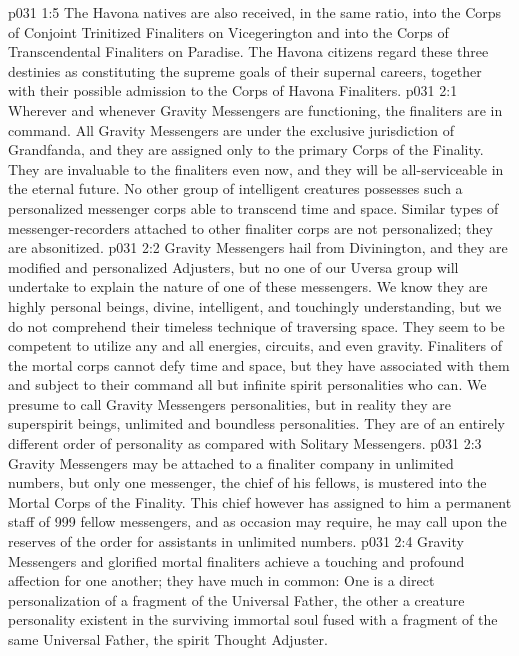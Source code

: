 \vs p031 1:5 The Havona natives are also received, in the same ratio, into the Corps of Conjoint Trinitized Finaliters on Vicegerington and into the Corps of Transcendental Finaliters on Paradise. The Havona citizens regard these three destinies as constituting the supreme goals of their supernal careers, together with their possible admission to the Corps of Havona Finaliters.
\vs p031 2:1 Wherever and whenever Gravity Messengers are functioning, the finaliters are in command. All Gravity Messengers are under the exclusive jurisdiction of Grandfanda, and they are assigned only to the primary Corps of the Finality. They are invaluable to the finaliters even now, and they will be all\hyp{}serviceable in the eternal future. No other group of intelligent creatures possesses such a personalized messenger corps able to transcend time and space. Similar types of messenger\hyp{}recorders attached to other finaliter corps are not personalized; they are absonitized.
\vs p031 2:2 \pc Gravity Messengers hail from Divinington, and they are modified and personalized Adjusters, but no one of our Uversa group will undertake to explain the nature of one of these messengers. We know they are highly personal beings, divine, intelligent, and touchingly understanding, but we do not comprehend their timeless technique of traversing space. They seem to be competent to utilize any and all energies, circuits, and even gravity. Finaliters of the mortal corps cannot defy time and space, but they have associated with them and subject to their command all but infinite spirit personalities who can. We presume to call Gravity Messengers personalities, but in reality they are superspirit beings, unlimited and boundless personalities. They are of an entirely different order of personality as compared with Solitary Messengers.
\vs p031 2:3 \pc Gravity Messengers may be attached to a finaliter company in unlimited numbers, but only one messenger, the chief of his fellows, is mustered into the Mortal Corps of the Finality. This chief however has assigned to him a permanent staff of 999 fellow messengers, and as occasion may require, he may call upon the reserves of the order for assistants in unlimited numbers.
\vs p031 2:4 Gravity Messengers and glorified mortal finaliters achieve a touching and profound affection for one another; they have much in common: One is a direct personalization of a fragment of the Universal Father, the other a creature personality existent in the surviving immortal soul fused with a fragment of the same Universal Father, the spirit Thought Adjuster.
